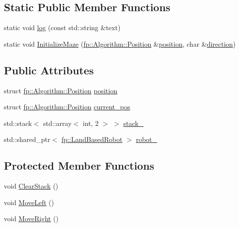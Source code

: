 \subsection*{Static Public Member Functions}
\begin{DoxyCompactItemize}
\item 
static void \hyperlink{classfp_1_1_algorithm_ad8d891300bf2a5be160a629a93e7058d}{log} (const std\+::string \&text)
\item 
static void \hyperlink{classfp_1_1_algorithm_a69fe7bd633b0e23593e7808babe4e90d}{Initialize\+Maze} (\hyperlink{structfp_1_1_algorithm_1_1_position}{fp\+::\+Algorithm\+::\+Position} \&\hyperlink{classfp_1_1_algorithm_a841339b57c3d2739325f3f421ada43b6}{position}, char \&\hyperlink{classfp_1_1_algorithm_afdbf632b658aea1aef75caa90e60a8fc}{direction})
\end{DoxyCompactItemize}
\subsection*{Public Attributes}
\begin{DoxyCompactItemize}
\item 
struct \hyperlink{structfp_1_1_algorithm_1_1_position}{fp\+::\+Algorithm\+::\+Position} \hyperlink{classfp_1_1_algorithm_a841339b57c3d2739325f3f421ada43b6}{position}
\item 
struct \hyperlink{structfp_1_1_algorithm_1_1_position}{fp\+::\+Algorithm\+::\+Position} \hyperlink{classfp_1_1_algorithm_a94d3b3797f19988f49fbda76013c3899}{current\+\_\+pos}
\item 
std\+::stack$<$ std\+::array$<$ int, 2 $>$ $>$ \hyperlink{classfp_1_1_algorithm_a3a646d05e1d457e73608134417b55113}{stack\+\_\+}
\item 
std\+::shared\+\_\+ptr$<$ \hyperlink{classfp_1_1_land_based_robot}{fp\+::\+Land\+Based\+Robot} $>$ \hyperlink{classfp_1_1_algorithm_a9937e133d060b6216a30055dc400ac10}{robot\+\_\+}
\end{DoxyCompactItemize}
\subsection*{Protected Member Functions}
\begin{DoxyCompactItemize}
\item 
void \hyperlink{classfp_1_1_algorithm_ac289d75b6850d5ad4a888360b3cfeda9}{Clear\+Stack} ()
\item 
void \hyperlink{classfp_1_1_algorithm_aaa34202f81b3b971590cc7608f0665df}{Move\+Left} ()
\item 
void \hyperlink{classfp_1_1_algorithm_a038bec51ce281896e229908b0822b749}{Move\+Right} ()
\end{DoxyCompactItemize}
